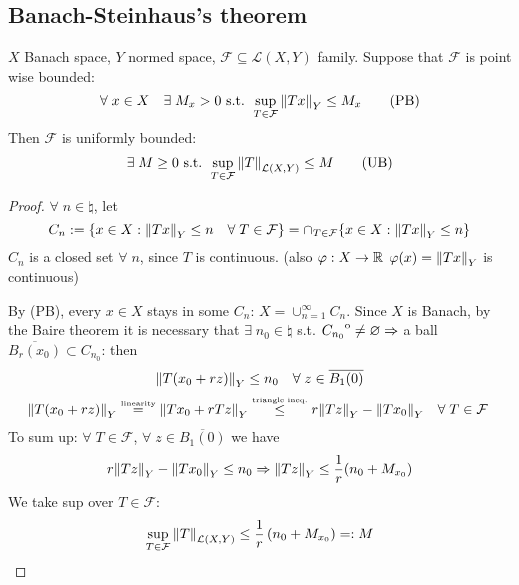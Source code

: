 \subsection{Banach-Steinhaus's theorem}
\begin{theorem}
    \(X\) Banach space, \(Y\) normed space, \(\mathcal{F} \subseteq \mathcal{L}(X, Y)\) family.
    Suppose that \(\mathcal{F}\) is point wise bounded: 
    \[
        \forall\; x \in X \quad \exists \; M_x >0 \text{ s.t. } \sup_{T \in \mathcal{F}} \norm{Tx}_Y \leq M_x \tag*{(PB)}
    \]
    Then \(\mathcal{F} \) is uniformly bounded: 
    \[
        \exists \; M \geq 0 \text{ s.t. } \sup_{T \in \mathcal{F}} \norm{T}_{\mathcal{L}(X, Y)} \leq M \tag*{(UB)}
    \]
\end{theorem}
\begin{proof}
    \(\forall \; n \in \natural\), let 
    \[
        C_n := \{ x \in X: \norm{Tx}_Y \leq n \quad \forall \; T \in \mathcal{F} \} 
        = \cap_{T \in \mathcal{F}} \{ x \in X: \norm{Tx}_Y \leq n \}
    \]
    \(C_n\) is a closed set \(\forall \; n\), since \(T\) is continuous. (also \(\varphi: X \to \mathbb{R} \) \(\varphi(x)=\norm{Tx}_Y\) is continuous)

    By (PB), every \(x \in X\) stays in some \(C_n\): \(X = \cup_{n=1}^\infty C_n\). 
    Since \(X\) is Banach, by the Baire theorem it is necessary that \(\exists \; n_0 \in \natural\) s.t. \({\kern0ptC_{n_0}}^{\mathrm{o}} \neq \varnothing \Rightarrow\) a ball \(\overline{B_r(x_0)} \subset C_{n_0}\): then
    \[
        \norm{T(x_0+rz)}_Y \leq n_0 \quad \forall \; z \in \overline{B_1(0)}
    \]
    \[
        \norm{T(x_0 + rz)}_Y \overset{\text{\tiny{linearity}}}{=} \norm{Tx_0 + rTz}_Y \overset{\text{\tiny{triangle ineq.}}}{\leq} r\norm{Tz}_Y - \norm{Tx_0}_Y \quad \forall \; T \in \mathcal{F} \; 
    \]
    To sum up: \(\forall \; T \in \mathcal{F} \), \(\forall \; z \in \overline{B_1(0)}\) we have 
    \[
        r \norm{Tz}_Y - \norm{Tx_0}_Y \leq n_0 \Rightarrow \norm{Tz}_Y \leq \frac{1}{r}(n_0 + M_{x_0})
    \]
    We take sup over \(T \in \mathcal{F}\):
    \[
        \sup_{T \in \mathcal{F}} \norm{T}_{\mathcal{L}(X, Y)} \leq \frac{1}{r} \left(n_0 + M_{x_0}\right) =: M
    \]
\end{proof}

